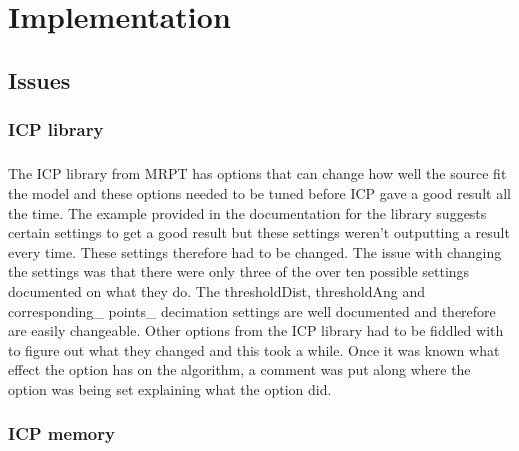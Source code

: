 \chapter{Implementation}

%
%
\section{Issues}
\subsection{ICP library}
\paragraph{}
The ICP library from MRPT has options that can change how well the source fit the model and these options needed to be tuned before ICP gave a good result all the time. The example provided in the documentation for the library suggests certain settings to get a good result but these settings weren't outputting a result every time. These settings therefore had to be changed. The issue with changing the settings was that there were only three of the over ten possible settings documented on what they do. The thresholdDist, thresholdAng and corresponding\_ points\_ decimation settings are well documented and therefore are easily changeable. Other options from the ICP library had to be fiddled with to figure out what they changed and this took a while. Once it was known what effect the option has on the algorithm, a comment was put along where the option was being set explaining what the option did.

\subsection{ICP memory}
